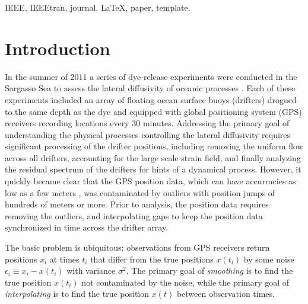 \documentclass[10pt,journal]{IEEEtran}
\begin{document}
\begin{IEEEkeywords}
IEEE, IEEEtran, journal, \LaTeX, paper, template.
\end{IEEEkeywords}




%
\section{Introduction}
%



In the summer of 2011 a series of dye-release experiments were conducted in the Sargasso Sea to assess the lateral diffusivity of oceanic processes \cite{shcherbina2015-bams}. Each of these experiments included an array of floating ocean surface buoys (drifters) drogued to the same depth as the dye and equipped with global positioning system (GPS) receivers recording locations every 30 minutes. Addressing the primary goal of understanding the physical processes controlling the lateral diffusivity requires significant processing of the drifter positions, including removing the uniform flow across all drifters, accounting for the large scale strain field, and finally analyzing the residual spectrum of the drifters for hints of a dynamical process. However, it quickly became clear that the GPS position data, which can have accurracies as low as a few meters \cite{faa2016-report}, was contaminated by outliers  with position jumps of hundreds of meters or more. Prior to analysis, the position data requires removing the outliers, and interpolating gaps to keep the position data synchronized in time across the drifter array.

The basic problem is ubiquitous: observations from GPS receivers return positions $x_i$ at times $t_i$ that differ from the true positions $x(t_i)$ by some noise $\epsilon_i \equiv x_i - x(t_i)$ with variance $\sigma^2$. The primary goal of \emph{smoothing} is to find the true position $x(t_i)$ not contaminated by the noise, while the primary goal of \emph{interpolating} is to find the true position $x(t)$ between observation times.
\end{document}
